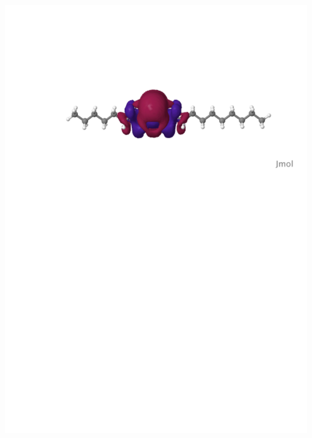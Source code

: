 \documentclass[mathserif, 10pt]{beamer}
\begin{document}
\begin{frame}
\begin{columns}
\begin{column}[b]{0.48\linewidth}
{    \includegraphics[scale=0.25, clip, viewport = 80 560 600 700]{figures/loc_orb_2.pdf}\\
}
\end{column}
\end{columns}
\end{frame}
\end{document}
